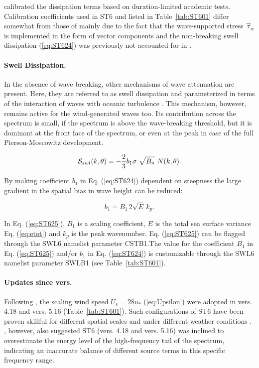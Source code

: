 \citet{art:RBW12} calibrated the dissipation terms based on duration-limited
academic tests. Calibration coefficients used in {\code ST6} and listed in
Table~\ref{tab:ST601} differ somewhat from those of \citet{art:RBW12}
mainly due to the fact that the wave-supported stress $\vec{\tau}_w$
is implemented in the form of vector components and the non-breaking swell
dissipation (\ref{eq:ST624}) was previously not accounted for in
\citet{art:RBW12}.

\paragraph{Swell Dissipation.} In the absence of wave breaking,
other mechanisms of wave attenuation are present. Here, they are
referred to as swell dissipation and parameterized in terms of
the interaction of waves with oceanic turbulence \citep{bk:Bab11}.
This mechanism, however, remains active for the wind-generated
waves too. Its contribution across the spectrum is small, if the
spectrum is above the wave-breaking threshold, but it is dominant
at the front face of the spectrum, or even at the peak in case of
the full Pierson-Moscowitz development.

\begin{equation}\label{eq:ST624}
  \cS_{swl}(k,\theta) = -\frac{2}{3}b_1 \sigma\ \sqrt{B_n}\ N(k,\theta).
\end{equation}

\noindent
By making coefficient $b_1$ in Eq. (\ref{eq:ST624}) dependent
on steepness the large gradient in the spatial bias in wave height
can be reduced:

\begin{equation}\label{eq:ST625}
   b_1 = B_1 \, 2\sqrt{E}\,k_p .
\end{equation}

In Eq. (\ref{eq:ST625}), $B_1$ is a scaling coefficient,
$E$  is the total sea surface variance Eq. (\ref{eq:etot}) and $k_p$
is the peak wavenumber.  Eq. (\ref{eq:ST625}) can be
flagged through the {\F SWL6} namelist parameter {\code CSTB1}.The value for the
coefficient $B_1$ in Eq. (\ref{eq:ST625}) and/or $b_1$ in Eq. (\ref{eq:ST624})
is customizable through the {\F SWL6} namelist parameter {\code SWLB1}
(see Table~\ref{tab:ST601}).

\noindent
\paragraph{Updates since vers.\,\WWver} Following \citet{art:RBW12}, the
scaling wind speed $U_s = 28u_{\ast}$ (\ref{eq:Upsilon}) were adopted in
vers. 4.18 and vers. 5.16 (Table~\ref{tab:ST601}). Such configurations of {\code ST6} have been proven
skillful for different spatial scales and under different weather
conditions \citep[e.g.][]{art:ZBRY15, liu2017}. \citet[][their Fig. 5]{art:ZBRY15},
however, also suggested {\code ST6} (vers. 4.18 and vers. 5.16) was inclined to
overestimate the energy level of the high-frequency tail of the spectrum,
indicating an inaccurate balance of different source terms in this
specific frequency range.

